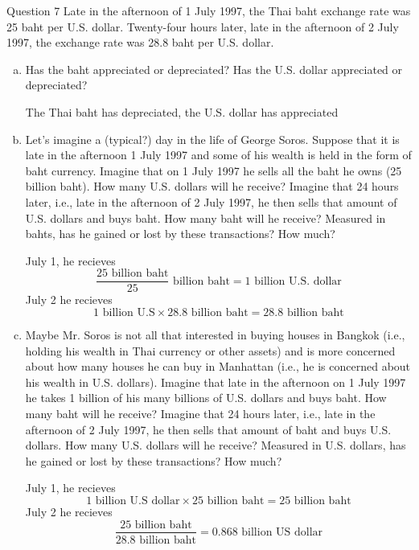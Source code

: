 \documentclass[a4paper]{article}
\newif\IfInSansMode
\numberwithin{equation}{section}
\numberwithin{figure}{section}
\begin{document}
	\begin{questionbox}{Question 7}
		Late in the afternoon of 1 July 1997, the Thai baht exchange rate was 25 baht per U.S. dollar. Twenty-four hours later, late in the afternoon of 2 July 1997, the exchange rate was 28.8 baht per U.S. dollar.
		\begin{enumerate}[(a)]
			\item Has the baht appreciated or depreciated? Has the U.S. dollar appreciated or depreciated?
			\begin{explanationbox}
				The Thai baht has depreciated, the U.S. dollar has appreciated
			\end{explanationbox}
			\item Let's imagine a (typical?) day in the life of George Soros. Suppose that it is late in the afternoon 1 July 1997 and some of his wealth is held in the form of baht currency. Imagine that on 1 July 1997 he sells all the baht he owns (25 billion baht). How many U.S. dollars will he receive? Imagine that 24 hours later, i.e., late in the afternoon of 2 July 1997, he then sells that amount of U.S. dollars and buys baht. How many baht will he receive? Measured in bahts, has he gained or lost by these transactions? How much?
			\begin{explanationbox}
				July 1, he recieves
				\[
					\frac{25\text{ billion baht}}{25}\text{ billion baht} = 1 \text{ billion U.S. dollar}
				\]
				July 2 he recieves
				\[
					1\text{ billion U.S} \times 28.8 \text{ billion baht} = 28.8 \text{ billion baht}
				\]
			\end{explanationbox}
			\item Maybe Mr. Soros is not all that interested in buying houses in Bangkok (i.e., holding his wealth in Thai currency or other assets) and is more concerned about how many houses he can buy in Manhattan (i.e., he is concerned about his wealth in U.S. dollars). Imagine that late in the afternoon on 1 July 1997 he takes 1 billion of his many billions of U.S. dollars and buys baht. How many baht will he receive? Imagine that 24 hours later, i.e., late in the afternoon of 2 July 1997, he then sells that amount of baht and buys U.S. dollars. How many U.S. dollars will he receive? Measured in U.S. dollars, has he gained or lost by these transactions? How much?
			\begin{explanationbox}
				July 1, he recieves
				\[
					1\text{ billion U.S dollar} \times 25 \text{ billion baht} = 25 \text{ billion baht}
				\]
				July 2 he recieves
				\[
					\frac{25\text{ billion baht}}{28.8 \text{ billion baht}} = 0.868 \text{ billion US dollar}
\]
\end{explanationbox}
\end{enumerate}
\end{questionbox}
\end{document}
